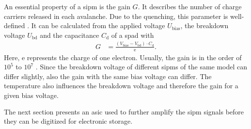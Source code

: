 


An essential property of a \ac{sipm} is the gain $G$.
It describes the number of charge carriers released in each avalanche.
Due to the quenching, this parameter is well-defined \cite{}.
It can be calculated from the applied voltage $U_\text{bias}$, the breakdown voltage $U_\text{bd}$ and the capacitance $C_\text{d}$ of a \ac{spad} with
\begin{align}
	G &= \frac{(V_\text{bias}- V_\text{bd})\cdot C_\text{d}}{\text{e}}.
\end{align}
Here, e represents the charge of one electron.
Usually, the gain is in the order of $10^5$ to $10^7$ \cite{nucl}.
Since the breakdown voltage of different \acp{sipm} of the same model can differ slightly, also the gain with the same bias voltage can differ.
The temperature also influences the breakdown voltage and therefore the gain for a given bias voltage.

The next section presents an \ac{asic} used to further amplify the \ac{sipm} signals before they can be digitized for electronic storage.


